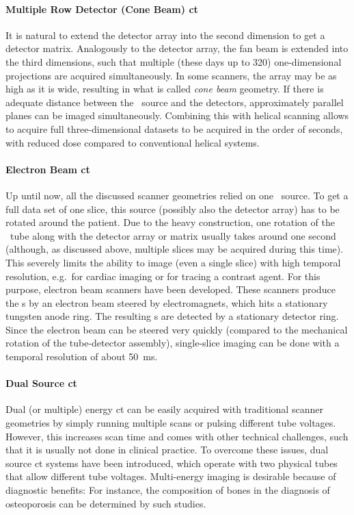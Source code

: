 \documentclass[../ml-tct.tex]{subfiles}
\begin{document}
\paragraph{Multiple Row Detector (Cone Beam) \gls{ct}} It is natural to extend the detector array into the second dimension to get a detector matrix.
Analogously to the detector array, the fan beam is extended into the third dimensions, such that multiple (these days up to \num{320}) one-dimensional projections are acquired simultaneously.
In some scanners, the array may be as high as it is wide, resulting in what is called \emph{cone beam} geometry.
If there is adequate distance between the \xray\ source and the detectors, approximately parallel planes can be imaged simultaneously.
Combining this with helical scanning allows to acquire full three-dimensional datasets to be acquired in the order of seconds, with reduced dose compared to conventional helical systems.
\paragraph{Electron Beam \gls{ct}} Up until now, all the discussed scanner geometries relied on one \xray\ source.
To get a full data set of one slice, this source (possibly also the detector array) has to be rotated around the patient.
Due to the heavy construction, one rotation of the \xray\ tube along with the detector array or matrix usually takes around one second (although, as discussed above, multiple slices may be acquired during this time).
This severely limits the ability to image (even a single slice) with high temporal resolution, e.g.\ for cardiac imaging or for tracing a contrast agent.
For this purpose, electron beam scanners have been developed.
These scanners produce the \xray{}s by an electron beam steered by electromagnets, which hits a stationary tungsten anode ring.
The resulting \xray{}s are detected by a stationary detector ring.
Since the electron beam can be steered very quickly (compared to the mechanical rotation of the tube-detector assembly), single-slice imaging can be done with a temporal resolution of about \SI{50}{\milli\second}.
\paragraph{Dual Source \gls{ct}} Dual (or multiple) energy \gls{ct} can be easily acquired with traditional scanner geometries by simply running multiple scans or pulsing different tube voltages.
However, this increases scan time and comes with other technical challenges, such that it is usually not done in clinical practice.
To overcome these issues, dual source \gls{ct} systems have been introduced, which operate with two physical tubes that allow different tube voltages.
Multi-energy imaging is desirable because of diagnostic benefits:
For instance, the composition of bones in the diagnosis of osteoporosis can be determined by such studies.
\end{document}
